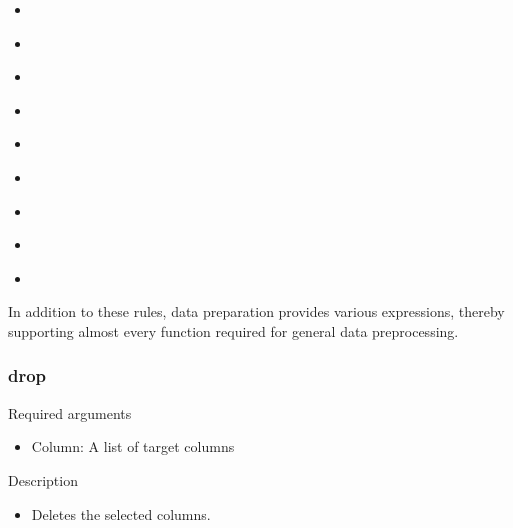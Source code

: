 \documentclass[letterpaper,10pt,english]{sphinxmanual}
\begin{document}
\begin{itemize}
\item {} 
{\hyperref[\detokenize{discovery/part07/rule_kinds:nest}]{}}

\item {} 
{\hyperref[\detokenize{discovery/part07/rule_kinds:unnest}]{}}

\item {} 
{\hyperref[\detokenize{discovery/part07/rule_kinds:flatten}]{}}

\item {} 
{\hyperref[\detokenize{discovery/part07/rule_kinds:aggregate}]{}}

\item {} 
{\hyperref[\detokenize{discovery/part07/rule_kinds:pivot}]{}}

\item {} 
{\hyperref[\detokenize{discovery/part07/rule_kinds:unpivot}]{}}

\item {} 
{\hyperref[\detokenize{discovery/part07/rule_kinds:join}]{}}

\item {} 
{\hyperref[\detokenize{discovery/part07/rule_kinds:union}]{}}

\item {} 
{\hyperref[\detokenize{discovery/part07/rule_kinds:window}]{}}

\end{itemize}

In addition to these rules, data preparation provides various expressions, thereby supporting almost every function required for general data preprocessing.


\subsubsection{drop}
\label{\detokenize{discovery/part07/rule_kinds:drop}}
Required arguments
\begin{itemize}
\item {} 
Column: A list of target columns

\end{itemize}

Description
\begin{itemize}
\item {} 
Deletes the selected columns.

\end{itemize}
\end{document}
